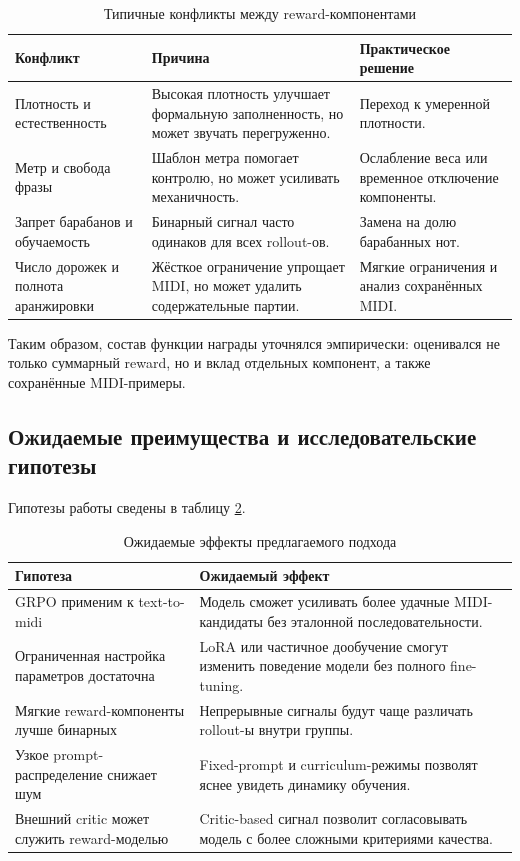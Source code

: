 \documentclass[a4paper,12pt]{extarticle}
\begin{document}
\begin{table}[ht]
\centering
\caption{Типичные конфликты между reward-компонентами}
\label{tab:reward_conflicts}
\begin{tabular}{p{}p{}p{}}
\toprule
Конфликт & Причина & Практическое решение \\
\midrule
Плотность и естественность & Высокая плотность улучшает формальную заполненность, но может звучать перегруженно. & Переход к умеренной плотности. \\
Метр и свобода фразы & Шаблон метра помогает контролю, но может усиливать механичность. & Ослабление веса или временное отключение компоненты. \\
Запрет барабанов и обучаемость & Бинарный сигнал часто одинаков для всех rollout-ов. & Замена на долю барабанных нот. \\
Число дорожек и полнота аранжировки & Жёсткое ограничение упрощает MIDI, но может удалить содержательные партии. & Мягкие ограничения и анализ сохранённых MIDI. \\
\bottomrule
\end{tabular}
\end{table}

Таким образом, состав функции награды уточнялся эмпирически: оценивался
не только суммарный reward, но и вклад отдельных компонент, а также
сохранённые MIDI-примеры.

\subsection{Ожидаемые преимущества и исследовательские гипотезы}

Гипотезы работы сведены в таблицу \ref{tab:approach_hypotheses}.

\begin{table}[ht]
\centering
\caption{Ожидаемые эффекты предлагаемого подхода}
\label{tab:approach_hypotheses}
\begin{tabular}{p{}p{}}
\toprule
Гипотеза & Ожидаемый эффект \\
\midrule
GRPO применим к text-to-midi & Модель сможет усиливать более удачные MIDI-кандидаты без эталонной последовательности. \\
Ограниченная настройка параметров достаточна & LoRA или частичное дообучение смогут изменить поведение модели без полного fine-tuning. \\
Мягкие reward-компоненты лучше бинарных & Непрерывные сигналы будут чаще различать rollout-ы внутри группы. \\
Узкое prompt-распределение снижает шум & Fixed-prompt и curriculum-режимы позволят яснее увидеть динамику обучения. \\
Внешний critic может служить reward-моделью & Critic-based сигнал позволит согласовывать модель с более сложными критериями качества. \\
\bottomrule
\end{tabular}
\end{table}
\end{document}
